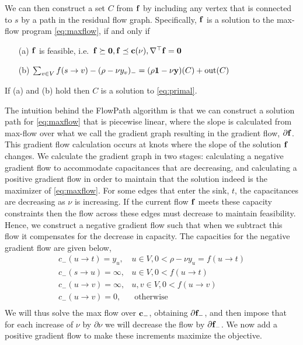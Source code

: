 We can then construct a set $C$ from $\mathbf{f}$ by including any vertex that is connected to $s$ by a path in the residual flow graph.
Specifically, $\mathbf{f}$ is a solution to the max-flow program \eqref{eq:maxflow}, if and only if 
\begin{enumerate}
\item[(a)] $\mathbf{f}$ is feasible, i.e.~$\mathbf{f} \succeq {\bf 0}, \mathbf{f}\preceq\mathbf{c}(\nu), \nabla^\top \mathbf{f} = {\bf 0}$
\item[(b)] $\sum_{v \in V} f(s \to v) - (\rho - \nu y_v)_- = (\rho {\bf 1} - \nu \mathbf{y})(C) + \textrm{out}(C)$
\end{enumerate}
If (a) and (b) hold then $C$ is a solution to \eqref{eq:primal}.

The intuition behind the FlowPath algorithm is that we can construct a solution path for \eqref{eq:maxflow} that is piecewise linear, where the slope is calculated from max-flow over what we call the gradient graph resulting in the gradient flow, $\partial \mathbf{f}$.
This gradient flow calculation occurs at knots where the slope of the solution $\mathbf{f}$ changes.
We calculate the gradient graph in two stages: calculating a negative gradient flow to accommodate capacitances that are decreasing, and calculating a positive gradient flow in order to maintain that the solution indeed is the maximizer of \eqref{eq:maxflow}.
For some edges that enter the sink, $t$, the capacitances are decreasing as $\nu$ is increasing.
If the current flow $\mathbf{f}$ meets these capacity constraints then the flow across these edges must decrease to maintain feasibility.
Hence, we construct a negative gradient flow such that when we subtract this flow it compensates for the decrease in capacity.
The capacities for the negative gradient flow are given below,
\begin{equation}
\label{eq:neg_graph}
\begin{array}{ll}
 c_-(u \to t) = y_u, &u \in V, 0 < \rho - \nu y_u = f(u \to t)\\
c_-(s \to u) = \infty, &u \in V, 0 < f(u \to t)\\
c_-(u \to v) = \infty, &u,v \in V, 0 < f(u \to v)\\
c_-(u \to v) = 0, &\textrm{ otherwise}\\
\end{array}
\end{equation} 
We will thus solve the max flow over $\mathbf{c}_-$, obtaining $\partial \mathbf{f}_-$, and then impose that for each increase of $\nu$ by $\partial \nu$ we will decrease the flow by $\partial \mathbf{f}_-$.
We now add a positive gradient flow to make these increments maximize the objective.
